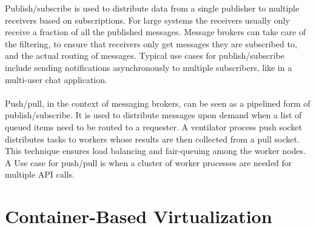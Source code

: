 \newpage
\noindent
Publish/subscribe is used to distribute data from a single publisher to multiple receivers based on subscriptions. For large systems the receivers usually only receive a fraction of all the published messages. Message brokers can take care of the filtering, to ensure that receivers only get messages they are subscribed to, and the actual routing of messages. Typical use cases for publish/subscribe include sending notifications asynchronously to multiple subscribers, like in a multi-user chat application.
\\ \\
Push/pull, in the context of messaging brokers, can be seen as a pipelined form of publish/subscribe. It is used to distribute messages upon demand when a list of queued items need to be routed to a requester. A ventilator process push socket distributes tasks to workers whose results are then collected from a pull socket. This technique ensures load balancing and fair-queuing among the worker nodes. A Use case for push/pull is when a cluster of worker processes are needed for multiple API calls.

\section{Container-Based Virtualization}

